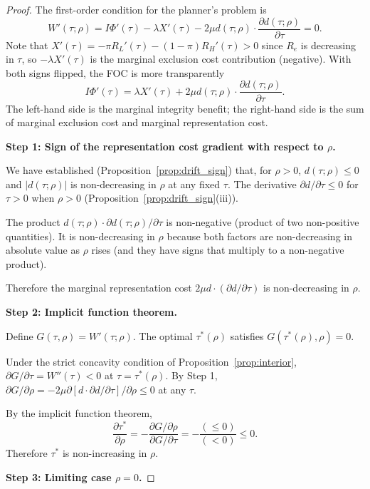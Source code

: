 \begin{proof}
The first-order condition for the planner's problem is
\[
W'(\tau; \rho) = I \Phi'(\tau) - \lambda X'(\tau) - 2 \mu d(\tau; \rho) \cdot \frac{\partial d(\tau; \rho)}{\partial \tau} = 0.
\]
Note that $X'(\tau) = -\pi R_L'(\tau) - (1-\pi) R_H'(\tau) > 0$ since $R_e$ is decreasing in $\tau$, so $-\lambda X'(\tau)$ is the marginal exclusion cost contribution (negative). With both signs flipped, the FOC is more transparently
\[
I \Phi'(\tau) = \lambda X'(\tau) + 2 \mu d(\tau; \rho) \cdot \frac{\partial d(\tau; \rho)}{\partial \tau}.
\]
The left-hand side is the marginal integrity benefit; the right-hand side is the sum of marginal exclusion cost and marginal representation cost.

\textbf{Step 1: Sign of the representation cost gradient with respect to $\rho$.}

We have established (Proposition~\ref{prop:drift_sign}) that, for $\rho > 0$, $d(\tau; \rho) \leq 0$ and $|d(\tau; \rho)|$ is non-decreasing in $\rho$ at any fixed $\tau$. The derivative $\partial d / \partial \tau \leq 0$ for $\tau > 0$ when $\rho > 0$ (Proposition~\ref{prop:drift_sign}(iii)).

The product $d(\tau; \rho) \cdot \partial d(\tau; \rho)/\partial \tau$ is non-negative (product of two non-positive quantities). It is non-decreasing in $\rho$ because both factors are non-decreasing in absolute value as $\rho$ rises (and they have signs that multiply to a non-negative product).

Therefore the marginal representation cost $2\mu d \cdot (\partial d / \partial \tau)$ is non-decreasing in $\rho$.

\textbf{Step 2: Implicit function theorem.}

Define $G(\tau, \rho) = W'(\tau; \rho)$. The optimal $\tau^*(\rho)$ satisfies $G(\tau^*(\rho), \rho) = 0$.

Under the strict concavity condition of Proposition~\ref{prop:interior}, $\partial G / \partial \tau = W''(\tau) < 0$ at $\tau = \tau^*(\rho)$. By Step 1, $\partial G / \partial \rho = -2\mu \partial[d \cdot \partial d/\partial \tau]/\partial \rho \leq 0$ at any $\tau$.

By the implicit function theorem,
\[
\frac{\partial \tau^*}{\partial \rho} = -\frac{\partial G/\partial \rho}{\partial G/\partial \tau} = -\frac{(\leq 0)}{(<0)} \leq 0.
\]
Therefore $\tau^*$ is non-increasing in $\rho$.

\textbf{Step 3: Limiting case $\rho = 0$.}


\end{proof}
